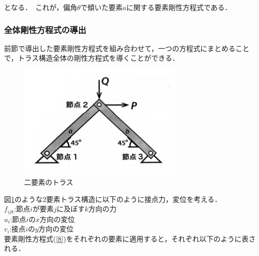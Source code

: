 \documentclass[a4paper,11pt,uplatex]{jsarticle}
\begin{document}
となる．　これが，偏角$\theta$で傾いた要素$a$に関する要素剛性方程式である．

\subsubsection{全体剛性方程式の導出}
前節で導出した要素剛性方程式を組み合わせて，一つの方程式にまとめることで，トラス構造全体の剛性方程式を導くことができる．

\begin{figure}[H]
  \begin{center}
    \includegraphics[width = 8cm]{画像/trus.png}
    \caption{二要素のトラス}
    \label{2トラス}
  \end{center}
\end{figure}

図\ref{2トラス}のような2要素トラス構造に以下のように接点力，変位を考える．\\
$f_{ijk}$:節点$i$が要素$j$に及ぼす$k$方向の力 \\
$u_i$:節点$i$の$x$方向の変位 \\
$v_i$:接点$i$の$y$方向の変位 \\

要素剛性方程式(\ref{8})をそれぞれの要素に適用すると，それぞれ以下のように表される．
\end{document}
